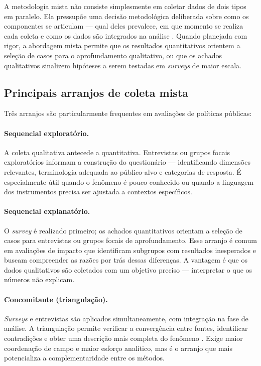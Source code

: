 \documentclass[12pt, a4paper, openany]{book}
\begin{document}
A metodologia mista n\~ao consiste simplesmente em coletar dados de dois tipos em paralelo. Ela pressup\~oe uma decis\~ao metodol\'ogica deliberada sobre como os componentes se articulam --- qual deles prevalece, em que momento se realiza cada coleta e como os dados s\~ao integrados na an\'alise \citep{creswell2014research}. Quando planejada com rigor, a abordagem mista permite que os resultados quantitativos orientem a sele\c{c}\~ao de casos para o aprofundamento qualitativo, ou que os achados qualitativos sinalizem hip\'oteses a serem testadas em \textit{surveys} de maior escala.

\subsection{Principais arranjos de coleta mista}

Tr\^es arranjos s\~ao particularmente frequentes em avalia\c{c}\~oes de pol\'iticas p\'ublicas:

\paragraph{Sequencial explorat\'orio.} A coleta qualitativa antecede a quantitativa. Entrevistas ou grupos focais explorat\'orios informam a constru\c{c}\~ao do question\'ario --- identificando dimens\~oes relevantes, terminologia adequada ao p\'ublico-alvo e categorias de resposta. \'E especialmente \'util quando o fen\^omeno \'e pouco conhecido ou quando a linguagem dos instrumentos precisa ser ajustada a contextos espec\'ificos.

\paragraph{Sequencial explanat\'orio.} O \textit{survey} \'e realizado primeiro; os achados quantitativos orientam a sele\c{c}\~ao de casos para entrevistas ou grupos focais de aprofundamento. Esse arranjo \'e comum em avalia\c{c}\~oes de impacto que identificam subgrupos com resultados inesperados e buscam compreender as raz\~oes por tr\'as dessas diferen\c{c}as. A vantagem \'e que os dados qualitativos s\~ao coletados com um objetivo preciso --- interpretar o que os n\'umeros n\~ao explicam.

\paragraph{Concomitante (triangula\c{c}\~ao).} \textit{Surveys} e entrevistas s\~ao aplicados simultaneamente, com integra\c{c}\~ao na fase de an\'alise. A triangula\c{c}\~ao permite verificar a converg\^encia entre fontes, identificar contradi\c{c}\~oes e obter uma descri\c{c}\~ao mais completa do fen\^omeno \citep{patton2002qualitative,creswell2014research}. Exige maior coordena\c{c}\~ao de campo e maior esfor\c{c}o anal\'itico, mas \'e o arranjo que mais potencializa a complementaridade entre os m\'etodos.
\end{document}

